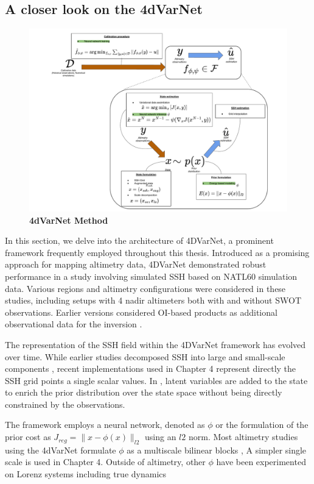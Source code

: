 \begin{bibunit}
\section{A closer look on the 4dVarNet}
\begin{figure}[h]
    \centering
    \includegraphics[width=\textwidth]{00_LitReview/Method-4dvarnet.pdf}
    \caption{\textbf{4dVarNet Method}}
    \label{fig:method}
\end{figure}
In this section, we delve into the architecture of 4DVarNet, a prominent framework frequently employed throughout this thesis. 
Introduced as a promising approach for mapping altimetry data, 4DVarNet demonstrated robust performance in a study involving simulated SSH based on NATL60 simulation data\cite{fablet_end2end_2021}. Various regions \cite{beauchamp4DVarNetSSHEndtoendLearning2023} and altimetry configurations were considered in these studies, including setups with 4 nadir altimeters both with and without SWOT observations. Earlier versions considered OI-based products as additional observational data for the inversion \cite{fablet_end2end_2021}.

The representation of the SSH field within the 4DVarNet framework has evolved over time. While earlier studies decomposed SSH into large and small-scale components \cite{beauchampDatadrivenLearningbasedInterpolations2021}, recent implementations used in Chapter 4 represent directly the SSH grid points a single scalar values. In  \cite{fablet_end2end_2021}, latent variables are added to the state to enrich the prior distribution over the state space without being directly constrained by the observations.

The framework employs a neural network, denoted as  $\phi$  or the formulation of the prior cost as $J_{reg}= \|x - \phi(x)\|_{l2}$ using an $l2$ norm.
Most altimetry studies using the 4dVarNet formulate $\phi$ as a multiscale bilinear blocks \cite{fabletBilinearResidualNeural2018}, A simpler single scale is used in Chapter 4. Outside of altimetry, other $\phi$ have been experimented on Lorenz systems including true dynamics\cite{fabletLearningVariationalData2021}


\end{bibunit}
